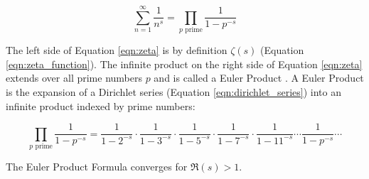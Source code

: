 \documentclass[11pt, oneside]{article}   	%
\theoremstyle{definition}
\begin{document}
\medskip
\begin{equation}
\sum^\infty_{n = 1} \frac{1}{n^s} = \! \! \! \prod_{\text{$p$ prime}} \!  \frac{1}{1 - p^{-s}}
\label{eqn:zeta}
\end{equation}

\bigskip
\noindent
The left side of Equation \ref{eqn:zeta} is by definition $\zeta(s)$ (Equation \ref{eqn:zeta_function}). The infinite product on the right side of Equation \ref{eqn:zeta}  
extends over all prime numbers $p$ and is called a Euler Product \cite{euler_product}. A Euler Product is the expansion of a Dirichlet series 
(Equation \ref{eqn:dirichlet_series}) into an infinite product indexed by prime numbers:

\begin{equation*}
\prod_{\text{$p$ prime}} \!  \frac{1}{1 - p^{-s}} = \frac{1}{1 - 2^{-s}} \cdot \frac{1}{1 - 3^{-s}} \cdot  \frac{1}{1 - 5^{-s}} \cdot  \frac{1}{1 - 7^{-s}} \cdot  \frac{1}{1 - 11^{-s}} \cdots  \frac{1}{1 - p^{-s}} \cdots
\end{equation*}

\bigskip
\noindent
The Euler Product Formula converges for $\Re(s) > 1$.

\newpage


\end{document}
